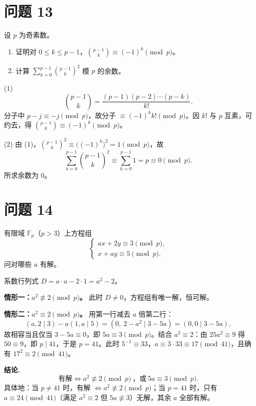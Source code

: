\documentclass{article}
\begin{document}
\section{问题 13}

设 $p$ 为奇素数。

\begin{enumerate}[(1)]
  \item 证明对 $0\le k\le p-1$，$\binom{p-1}{k}\equiv(-1)^k\pmod p$。
  \item 计算 $\sum_{k=0}^{p-1}\binom{p-1}{k}^2$ 模 $p$ 的余数。
\end{enumerate}

\begin{solution}
  (1)
  \[
    \binom{p-1}{k}=\frac{(p-1)(p-2)\cdots(p-k)}{k!}.
  \]
  分子中 $p-j\equiv -j\pmod p$，故分子 $\equiv(-1)^k k!\pmod p$。因 $k!$ 与 $p$ 互素，可约去，得 $\binom{p-1}{k}\equiv(-1)^k\pmod p$。

  (2) 由 (1)，$\binom{p-1}{k}^2\equiv\big((-1)^k\big)^2=1\pmod p$，故
  \[
    \sum_{k=0}^{p-1}\binom{p-1}{k}^2\equiv\sum_{k=0}^{p-1}1=p\equiv 0\pmod p .
  \]
  所求余数为 $\boxed{0}$。
\end{solution}

\section{问题 14}

有限域 $\mathbb F_p$（$p>3$）上方程组
\[
  \begin{cases}ax+2y\equiv 3\pmod p,\\ x+ay\equiv 5\pmod p.\end{cases}
\]
问对哪些 $a$ 有解。

\begin{solution}
  系数行列式 $D=a\cdot a-2\cdot1=a^2-2$。

  \textbf{情形一：$a^2\not\equiv 2\pmod p$。} 此时 $D\ne0$，方程组有唯一解，恒可解。

  \textbf{情形二：$a^2\equiv 2\pmod p$。} 用第一行减去 $a$ 倍第二行：
  \[
    (a,2\mid3)-a(1,a\mid5)=(0,\ 2-a^2\mid 3-5a)=(0,0\mid 3-5a),
  \]
  故相容当且仅当 $3-5a\equiv0$，即 $5a\equiv3\pmod p$。结合 $a^2\equiv2$：由 $25a^2\equiv9$ 得 $50\equiv9$，即 $p\mid 41$，于是 $p=41$。此时 $5^{-1}\equiv33$，$a\equiv3\cdot33\equiv17\pmod{41}$，且确有 $17^2\equiv2\pmod{41}$。

  \textbf{结论.}
  \[
    \boxed{\ \text{有解}\iff a^2\not\equiv2\pmod p\ \text{，或}\ 5a\equiv3\pmod p.\ }
  \]
  具体地：当 $p\ne41$ 时，有解 $\iff a^2\not\equiv2\pmod p$；当 $p=41$ 时，只有 $a\equiv24\pmod{41}$（满足 $a^2\equiv2$ 但 $5a\not\equiv3$）无解，其余 $a$ 全部有解。
\end{solution}
\end{document}
